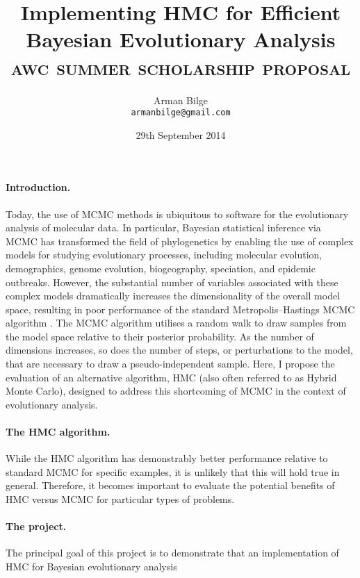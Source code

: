 \documentclass{article}
\title{Implementing \acl{HMC} for Efficient Bayesian Evolutionary Analysis \\
           \Large\textsc{awc summer scholarship proposal}}
\author{Arman Bilge \\ \texttt{armanbilge@gmail.com}}
\date{29th September 2014}
\begin{document}
    \maketitle

    \paragraph{Introduction.}
    Today, the use of \ac{MCMC} methods is ubiquitous to software for the
        evolutionary analysis of molecular data.
    In particular, Bayesian statistical inference via \ac{MCMC} has transformed
        the field of phylogenetics by enabling the use of complex models for
        studying evolutionary processes, including molecular evolution,
        demographics, genome evolution, biogeography, speciation, and epidemic
        outbreaks.
    However, the substantial number of variables associated with these complex
        models dramatically increases the dimensionality of the overall
        model space, resulting in poor performance of the standard
        Metropolis--Hastings MCMC algorithm \cite{Met+53,Has70}.
    The \ac{MCMC} algorithm utilises a random walk to draw samples from the
        model space relative to their posterior probability.
    As the number of dimensions increases, so does the number of steps, or
        perturbations to the model, that are necessary to draw a
        pseudo-independent sample.
    Here, I propose the evaluation of an alternative algorithm, \ac{HMC} (also
        often referred to as Hybrid Monte Carlo), designed to address this
        shortcoming of \ac{MCMC} in the context of evolutionary analysis.

    \paragraph*{The \ac{HMC} algorithm.}

    While the \ac{HMC} algorithm has demonstrably better performance relative
        to standard \ac{MCMC} for specific examples, it is unlikely that this
        will hold true in general.
    Therefore, it becomes important to evaluate the potential benefits of
        \ac{HMC} versus \ac{MCMC} for particular types of problems.

    \paragraph*{The project.}
    The principal goal of this project is to demonstrate that an implementation
        of \ac{HMC} for Bayesian evolutionary analysis
\end{document}
